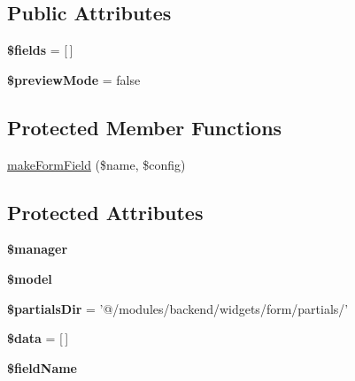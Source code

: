 \subsection*{Public Attributes}
\begin{DoxyCompactItemize}
\item 
\hypertarget{classDMA_1_1Friends_1_1Classes_1_1ActivityForm_ab9f1445590940a3564581d3481b942c5}{{\bfseries \$fields} = \mbox{[}$\,$\mbox{]}}\label{classDMA_1_1Friends_1_1Classes_1_1ActivityForm_ab9f1445590940a3564581d3481b942c5}

\item 
\hypertarget{classDMA_1_1Friends_1_1Classes_1_1ActivityForm_ac7ba33a73e3e8269a24e2b1b37b8778a}{{\bfseries \$preview\-Mode} = false}\label{classDMA_1_1Friends_1_1Classes_1_1ActivityForm_ac7ba33a73e3e8269a24e2b1b37b8778a}

\end{DoxyCompactItemize}
\subsection*{Protected Member Functions}
\begin{DoxyCompactItemize}
\item 
\hyperlink{classDMA_1_1Friends_1_1Classes_1_1ActivityForm_a8e64eb3aac3a88edbbc67700f40f7f61}{make\-Form\-Field} (\$name, \$config)
\end{DoxyCompactItemize}
\subsection*{Protected Attributes}
\begin{DoxyCompactItemize}
\item 
\hypertarget{classDMA_1_1Friends_1_1Classes_1_1ActivityForm_a6625f7f805756ad348523c8efc7eaba2}{{\bfseries \$manager}}\label{classDMA_1_1Friends_1_1Classes_1_1ActivityForm_a6625f7f805756ad348523c8efc7eaba2}

\item 
\hypertarget{classDMA_1_1Friends_1_1Classes_1_1ActivityForm_afa057e497b595e91ff28b7d82d453a19}{{\bfseries \$model}}\label{classDMA_1_1Friends_1_1Classes_1_1ActivityForm_afa057e497b595e91ff28b7d82d453a19}

\item 
\hypertarget{classDMA_1_1Friends_1_1Classes_1_1ActivityForm_a661164febcd7fafdb40b95f4fceb0539}{{\bfseries \$partials\-Dir} = '@/modules/backend/widgets/form/partials/'}\label{classDMA_1_1Friends_1_1Classes_1_1ActivityForm_a661164febcd7fafdb40b95f4fceb0539}

\item 
\hypertarget{classDMA_1_1Friends_1_1Classes_1_1ActivityForm_a7bba50ae9e6c7fe7fd5cbaa8dcf7a976}{{\bfseries \$data} = \mbox{[}$\,$\mbox{]}}\label{classDMA_1_1Friends_1_1Classes_1_1ActivityForm_a7bba50ae9e6c7fe7fd5cbaa8dcf7a976}

\item 
\hypertarget{classDMA_1_1Friends_1_1Classes_1_1ActivityForm_ae59dff70c79843060bc487578fae0846}{{\bfseries \$field\-Name}}\label{classDMA_1_1Friends_1_1Classes_1_1ActivityForm_ae59dff70c79843060bc487578fae0846}

\end{DoxyCompactItemize}


